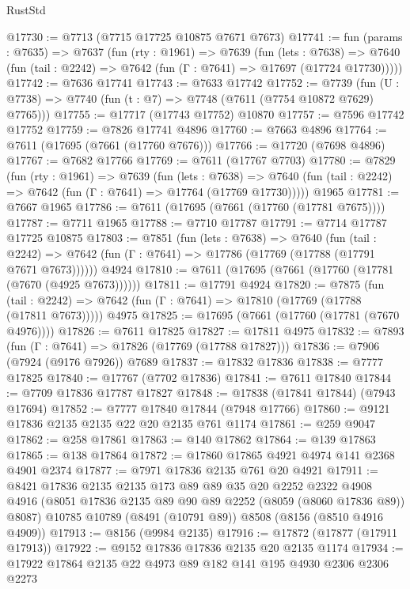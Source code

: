 \begin{lexlean}{RustStd}
\begin{coremodule}
@17730 := @7713 (@7715 @17725 @10875 @7671 @7673)
@17741 := fun (params : @7635) =>
  @7637
    (fun (rty : @1961) =>
    @7639
      (fun (lets : @7638) =>
      @7640 (fun (tail : @2242) => @7642 (fun (Γ : @7641) => @17697 (@17724 @17730)))))
@17742 := @7636 @17741
@17743 := @7633 @17742
@17752 := @7739
    (fun (U : @7738) => @7740 (fun (t : @7) => @7748 (@7611 (@7754 @10872 @7629) @7765)))
@17755 := @17717 (@17743 @17752) @10870
@17757 := @7596 @17742 @17752
@17759 := @7826 @17741 @4896
@17760 := @7663 @4896
@17764 := @7611 (@17695 (@7661 (@17760 @7676)))
@17766 := @17720 (@7698 @4896)
@17767 := @7682 @17766
@17769 := @7611 (@17767 @7703)
@17780 := @7829
    (fun (rty : @1961) =>
    @7639
      (fun (lets : @7638) =>
      @7640 (fun (tail : @2242) => @7642 (fun (Γ : @7641) => @17764 (@17769 @17730)))))
    @1965
@17781 := @7667 @1965
@17786 := @7611 (@17695 (@7661 (@17760 (@17781 @7675))))
@17787 := @7711 @1965
@17788 := @7710 @17787
@17791 := @7714 @17787 @17725 @10875
@17803 := @7851
    (fun (lets : @7638) =>
    @7640
      (fun (tail : @2242) =>
      @7642 (fun (Γ : @7641) => @17786 (@17769 (@17788 (@17791 @7671 @7673))))))
    @4924
@17810 := @7611 (@17695 (@7661 (@17760 (@17781 (@7670 (@4925 @7673))))))
@17811 := @17791 @4924
@17820 := @7875
    (fun (tail : @2242) => @7642 (fun (Γ : @7641) => @17810 (@17769 (@17788 (@17811 @7673)))))
    @4975
@17825 := @17695 (@7661 (@17760 (@17781 (@7670 @4976))))
@17826 := @7611 @17825
@17827 := @17811 @4975
@17832 := @7893 (fun (Γ : @7641) => @17826 (@17769 (@17788 @17827)))
@17836 := @7906 (@7924 (@9176 @7926)) @7689
@17837 := @17832 @17836
@17838 := @7777 @17825
@17840 := @17767 (@7702 @17836)
@17841 := @7611 @17840
@17844 := @7709 @17836 @17787 @17827
@17848 := @17838 (@17841 @17844) (@7943 @17694)
@17852 := @7777 @17840 @17844 (@7948 @17766)
@17860 := @9121 @17836 @2135 @2135 @22 @20 @2135 @761 @1174
@17861 := @259 @9047
@17862 := @258 @17861
@17863 := @140 @17862
@17864 := @139 @17863
@17865 := @138 @17864
@17872 := @17860 @17865 @4921 @4974 @141 @2368 @4901 @2374
@17877 := @7971 @17836 @2135 @761 @20 @4921
@17911 := @8421
    @17836
    @2135
    @2135
    @173
    @89
    @89
    @35
    @20
    @2252
    @2322
    @4908
    @4916
    (@8051 @17836 @2135 @89 @90 @89 @2252 (@8059 (@8060 @17836 @89)) @8087)
    @10785
    @10789
    (@8491 (@10791 @89))
    @8508
    (@8156 (@8510 @4916 @4909))
@17913 := @8156 (@9984 @2135)
@17916 := @17872 (@17877 (@17911 @17913))
@17922 := @9152 @17836 @17836 @2135 @20 @2135 @1174
@17934 := @17922 @17864 @2135 @22 @4973 @89 @182 @141 @195 @4930 @2306 @2306 @2273

\end{coremodule}
\end{lexlean}
